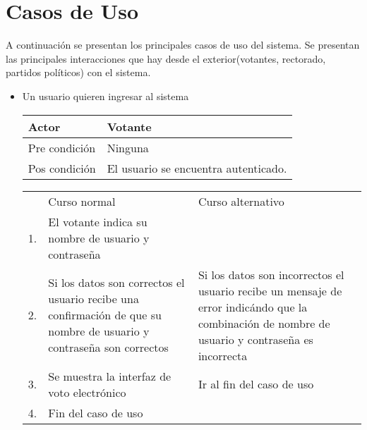 \section{Casos de Uso}

A continuaci\'on se presentan los principales casos de uso del sistema.
Se presentan las principales interacciones que hay desde el exterior(votantes, rectorado, partidos pol\'iticos) con el sistema.

\begin{itemize}
\item Un usuario quieren ingresar al sistema
\begin{center}
\begin{tabular}{ll}
Actor & Votante \\
\hline
Pre condición & Ninguna \\
\hline
Pos condición & El usuario se encuentra autenticado. \\
\hline
\end{tabular}
\medskip
\begin{tabular}{c p{4cm}|p{4cm}}
 & Curso normal & Curso alternativo \\
 1. & El votante indica su nombre de usuario y contraseña &  \\
 2. & Si los datos son correctos el usuario recibe una confirmación de que su nombre de usuario y contraseña son correctos & Si los datos son incorrectos el usuario recibe un mensaje de error indicándo que la combinación de nombre de usuario y contraseña es incorrecta \\
 3. & Se muestra la interfaz de voto electrónico & Ir al fin del caso de uso \\
4. & Fin del caso de uso& \\ 
\end{tabular}
\end{center}


\end{itemize}
